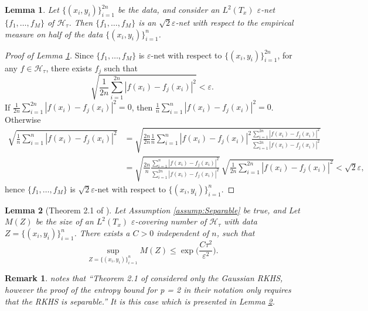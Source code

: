 \documentclass[twoside, onecolumn]{article}
\def\Hcal{\mathcal{H}}
\def\Hcal{\mathcal{H}}
\newtheorem{lemma}{Lemma}
\newtheorem{remark}{Remark}
\begin{document}
\begin{lemma}\label{lem:EpslnNetRestriction}
Let $\{(x_i, y_i)\}_{i=1}^{2n}$ be the data, and consider an $L^{2}(T_x)$ $\varepsilon$-net $\{f_1, \dots, f_M\}$ of $\mathcal{H}_\tau$. Then $\{f_1, \dots, f_M\}$ is an $\sqrt{2}\varepsilon$-net with respect to the empirical measure on half of the data $\{(x_i, y_i)\}_{i=1}^{n}$.
\end{lemma}

\begin{proof}[Proof of Lemma \ref{lem:EpslnNetRestriction}] Since $\{f_1, \dots, f_M\}$ is $\varepsilon$-net with respect to $\{(x_i,y_i)\}_{i=1}^{2n}$, for any $f\in \Hcal_{\tau}$, there exists $f_j$ such that
\[
\sqrt{\frac{1}{2n}\sum_{i=1}^{2n}|f(x_i) - f_j(x_i)|^{2}}<\varepsilon. 
\]
If $\frac{1}{2n}\sum_{i=1}^{2n}|f(x_i) - f_j(x_i)|^{2}=0$, then $\frac{1}{n}\sum_{i=1}^{n}|f(x_i) - f_j(x_i)|^{2}=0$. Otherwise
\begin{align*}
\sqrt{\frac{1}{n}\sum_{i=1}^{n}|f(x_i) - f_j(x_i)|^{2}}&=
\sqrt{\frac{2n}{2n}\frac{1}{n}\sum_{i=1}^{n}|f(x_i) - f_j(x_i)|^{2}
\frac{\sum_{i=1}^{2n}|f(x_i) - f_j(x_i)|^{2}}{\sum_{i=1}^{2n}|f(x_i)- f_j(x_i)|^2}}\\
&=\sqrt{\frac{2n}{n} \frac{\sum_{i=1}^{n}|f(x_i)- f_j(x_i)|^{2}}{\sum_{i=1}^{2n}|f(x_i)- f_j(x_i)|^{2}}}\,
\sqrt{\frac{1}{2n}\sum_{i=1}^{2n}|f(x_i)- f_j(x_i)|^2}< \sqrt{2}\varepsilon,
\end{align*}
hence $\{f_1, \dots, f_M\}$ is $\sqrt{2}\varepsilon$-net with respect to $\{(x_i,y_i)\}_{i=1}^{n}$.
\end{proof} 
 

\begin{lemma}[Theorem 2.1 of \cite{steinwart_fast_2007}]\label{lem:CoveringNum}
Let Assumption \ref{assump:Separable} be true, and
Let $M(Z)$ be the size of an $L^2(T_x)$ $\varepsilon$-covering number of $\Hcal_\tau$ with data $Z=\{(x_i, y_i)\}_{i=1}^{n}$.
There exists a $C>0$ independent of $n$, such that
\begin{equation}
\sup_{Z=\{(x_i, y_i)\}_{i=1}^{n}}M(Z)\leq \exp\bigg( \frac{ C\tau^2}{\varepsilon^2}\bigg).
\end{equation}
\end{lemma}
\begin{remark}
\cite{zhang2016quantile} notes that ``Theorem 2.1 of \cite{steinwart_fast_2007} considered
only the Gaussian RKHS, however the proof of the entropy bound for p = 2 in their notation
only requires that the RKHS is separable.'' It is this case which is presented in Lemma \ref{lem:CoveringNum}.
\end{remark}
\end{document}
